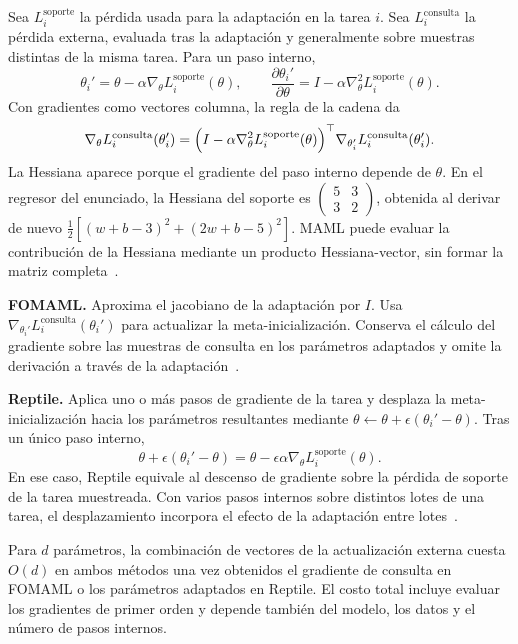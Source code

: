 Sea $L_i^{\mathrm{soporte}}$ la pérdida usada para la adaptación en
la tarea $i$. Sea $L_i^{\mathrm{consulta}}$ la pérdida externa,
evaluada tras la adaptación y generalmente sobre muestras
distintas de la misma tarea. Para un paso interno,
\[
    \theta_i'=\theta-\alpha\nabla_\theta L_i^{\mathrm{soporte}}(\theta),
    \qquad
    \frac{\partial\theta_i'}{\partial\theta}
    =I-\alpha\nabla_\theta^2 L_i^{\mathrm{soporte}}(\theta).
\]
Con gradientes como vectores columna, la regla de la cadena da
\[
    \nabla_\theta L_i^{\mathrm{consulta}}(\theta_i')
    =\Bigl(I-\alpha\nabla_\theta^2 L_i^{\mathrm{soporte}}(\theta)\Bigr)^\top
      \nabla_{\theta_i'}L_i^{\mathrm{consulta}}(\theta_i').
\]
La Hessiana aparece porque el gradiente del paso interno depende
de $\theta$. En el regresor del enunciado, la Hessiana del
soporte es $\begin{pmatrix}5&3\\3&2\end{pmatrix}$, obtenida al
derivar de nuevo $\frac{1}{2}[(w+b-3)^2+(2w+b-5)^2]$. MAML
puede evaluar la contribución de la Hessiana mediante un producto
Hessiana-vector, sin formar la matriz completa~\cite{finn2017}.

\textbf{FOMAML.}
Aproxima el jacobiano de la adaptación por $I$. Usa
$\nabla_{\theta_i'}L_i^{\mathrm{consulta}}(\theta_i')$
para actualizar la meta-inicialización. Conserva el cálculo
del gradiente sobre las muestras de consulta en los parámetros
adaptados y omite la derivación a través de la
adaptación~\cite{finn2017,nichol2018}.

\textbf{Reptile.}
Aplica uno o más pasos de gradiente de la tarea y desplaza la
meta-inicialización hacia los parámetros resultantes
mediante $\theta\leftarrow\theta+\epsilon(\theta_i'-\theta)$.
Tras un único paso interno,
\[
    \theta+\epsilon(\theta_i'-\theta)
    =\theta-\epsilon\alpha\nabla_\theta L_i^{\mathrm{soporte}}(\theta).
\]
En ese caso, Reptile equivale al descenso de gradiente
sobre la pérdida de soporte de la tarea muestreada. Con
varios pasos internos sobre distintos lotes de una tarea,
el desplazamiento incorpora el efecto de la adaptación
entre lotes~\cite{nichol2018}.

Para $d$ parámetros, la combinación de vectores de la
actualización externa cuesta $O(d)$ en ambos métodos
una vez obtenidos el gradiente de consulta en FOMAML o
los parámetros adaptados en Reptile. El costo total incluye
evaluar los gradientes de primer orden y depende también del
modelo, los datos y el número de pasos internos.
